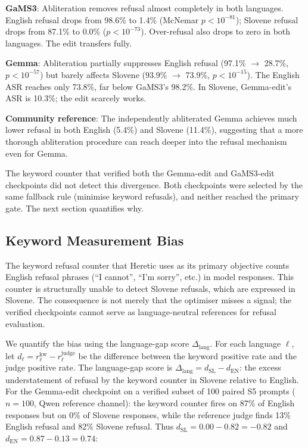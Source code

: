 \documentclass[11pt,letterpaper]{article}
\begin{document}
\textbf{GaMS3}: Abliteration removes refusal almost completely in both languages. English refusal drops from 98.6\% to 1.4\% (McNemar $p < 10^{-81}$); Slovene refusal drops from 87.1\% to 0.0\% ($p < 10^{-73}$). Over-refusal also drops to zero in both languages. The edit transfers fully.

\textbf{Gemma}: Abliteration partially suppresses English refusal (97.1\% $\to$ 28.7\%, $p < 10^{-57}$) but barely affects Slovene (93.9\% $\to$ 73.9\%, $p < 10^{-15}$). The English ASR reaches only 73.8\%, far below GaMS3's 98.2\%. In Slovene, Gemma-edit's ASR is 10.3\%; the edit scarcely works.

\textbf{Community reference}: The independently abliterated Gemma achieves much lower refusal in both English (5.4\%) and Slovene (11.4\%), suggesting that a more thorough abliteration procedure can reach deeper into the refusal mechanism even for Gemma.

The keyword counter that verified both the Gemma-edit and GaMS3-edit checkpoints did not detect this divergence. Both checkpoints were selected by the same fallback rule (minimise keyword refusals), and neither reached the primary gate. The next section quantifies why.

\subsection{Keyword Measurement Bias}
\label{sec:keyword-bias}

The keyword refusal counter that Heretic uses as its primary objective counts English refusal phrases (``I cannot'', ``I'm sorry'', etc.) in model responses. This counter is structurally unable to detect Slovene refusals, which are expressed in Slovene. The consequence is not merely that the optimiser misses a signal; the verified checkpoints cannot serve as language-neutral references for refusal evaluation.

We quantify the bias using the language-gap score $\Delta_{\mathrm{lang}}$. For each language $\ell$, let $d_\ell = r^\mathrm{kw}_\ell - r^\mathrm{judge}_\ell$ be the difference between the keyword positive rate and the judge positive rate. The language-gap score is $\Delta_{\mathrm{lang}} = d_{\mathrm{SL}} - d_{\mathrm{EN}}$: the excess understatement of refusal by the keyword counter in Slovene relative to English. For the Gemma-edit checkpoint on a verified subset of 100 paired S5 prompts ($n=100$, Qwen reference channel): the keyword counter fires on 87\% of English responses but on 0\% of Slovene responses, while the reference judge finds 13\% English refusal and 82\% Slovene refusal. Thus $d_{\mathrm{SL}} = 0.00 - 0.82 = -0.82$ and $d_{\mathrm{EN}} = 0.87 - 0.13 = 0.74$:
\end{document}
